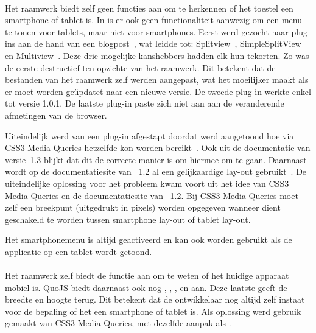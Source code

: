 \paragraph{\jqm}
Het raamwerk biedt zelf geen functies aan om te herkennen of het toestel een smartphone of tablet is.
In \jqm{} is er ook geen functionaliteit aanwezig om een menu te tonen voor tablets, maar niet voor smartphones. 
Eerst werd gezocht naar plug-ins aan de hand van een blogpost~\cite{Deering2012}, wat leidde tot: Splitview~\cite{Rahman2013}, SimpleSplitView~\cite{Yared2013} en Multiview~\cite{Franck2012}. 
Deze drie mogelijke kanshebbers hadden elk hun tekorten. 
Zo was de eerste destructief ten opzichte van het raamwerk.
Dit betekent dat de bestanden van het raamwerk zelf werden aangepast, wat het moeilijker maakt als er moet worden geüpdatet naar een nieuwe versie. 
De tweede plug-in werkte enkel tot versie 1.0.1.
De laatste plug-in paste zich niet aan aan de veranderende afmetingen van de browser. 

Uiteindelijk werd van een plug-in afgestapt doordat werd aangetoond hoe via CSS3 Media Queries hetzelfde kon worden bereikt~\cite{Hadlock2012}. 
Ook uit de documentatie van versie~1.3 \cite{JQuery2013e} blijkt dat dit de correcte manier is om hiermee om te gaan.
Daarnaast wordt op de documentatiesite van \jqm{}~1.2 al een gelijkaardige lay-out gebruikt~\cite{JQuery2012b}. 
De uiteindelijke oplossing voor het probleem kwam voort uit het idee van CSS3 Media Queries en de documentatiesite van \jqm{}~1.2.
Bij CSS3 Media Queries moet zelf een breekpunt (uitgedrukt in pixels) worden opgegeven wanneer dient geschakeld te worden tussen smartphone lay-out of tablet lay-out.

Het smartphonemenu is altijd geactiveerd en kan ook worden gebruikt als de applicatie op een tablet wordt getoond.

\paragraph{\lungo}
Het raamwerk zelf biedt de functie  aan om te weten of het huidige apparaat mobiel is.
QuoJS biedt daarnaast ook nog , , ,  en  aan.
Deze laatste geeft de breedte en hoogte terug.
Dit betekent dat de ontwikkelaar nog altijd zelf instaat voor de bepaling of het een smartphone of tablet is.
Als oplossing werd gebruik gemaakt van CSS3 Media Queries, met dezelfde aanpak als \jqm{}.

